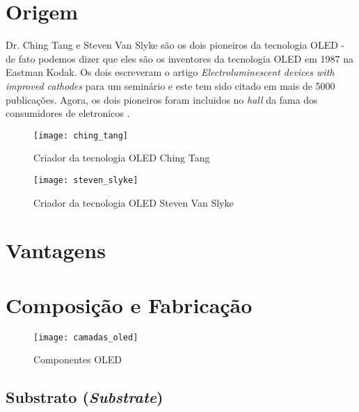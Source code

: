\section{Origem}
\label{sec:camadas}

Dr. Ching Tang e Steven Van Slyke são os dois pioneiros da tecnologia OLED - de fato podemos dizer que eles são os inventores da tecnologia OLED em 1987 na Eastman Kodak. Os dois escreveram o artigo \textit{Electroluminescent devices with improved cathodes} para um seminário e este tem sido citado em mais de 5000 publicações. Agora, os dois pioneiros foram incluidos no \textit{hall} da fama dos consumidores de eletronicos \cite{OLEDPioneers}. 

\begin{figure}[!h]
  \centering
  \texttt{[image: ching\_tang]} 
  \caption{Criador da tecnologia OLED Ching Tang}
  \label{fig:ching_tang} 
\end{figure}

\begin{figure}[!h]
  \centering
  \texttt{[image: steven\_slyke]} 
  \caption{Criador da tecnologia OLED Steven Van Slyke}
  \label{fig:steven_slyke} 
\end{figure}


\section{Vantagens}
\label{sec:vantagens}


\section{Composição e Fabricação}
\label{sec:camadas}

\begin{figure}[!h]
  \centering
  \texttt{[image: camadas\_oled]} 
  \caption{Componentes OLED}
  \label{fig:camadas_oled} 
\end{figure}


\subsection{Substrato (\textit{Substrate})}
\label{sec:substrato}

